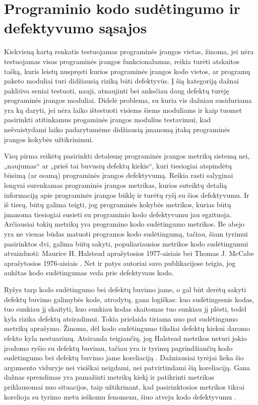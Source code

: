 \documentclass{VUMIFPSbakalaurinis}
\begin{document}
\section{Programinio kodo sudėtingumo ir defektyvumo sąsajos}
Kiekvieną kartą renkatis testuojamas programinės įrangos vietas, žinoma, jei nėra testuojamas visas programinės įrangos funkcionalumas, reikia turėti atskaitos tašką, kuris leistų nuspręsti kurios programinės įrangos kodo vietos, ar programų paketo moduliai turi didžiausią riziką būti defektyvūs. Į šią kategoriją dažnai pakliūva seniai testuoti, nauji, atnaujinti bei anksčiau daug defektų turėję programinės įrangos moduliai. Didelė problema, su kuria vis dažniau susiduriama yra ką daryti, jei nėra laiko ištestuoti visiems šiems moduliams ir kaip tuomet pasirinkti atitinkamus progaminės įrangos modulius testavimui, kad nešvaistydami laiko padarytumėme didžiausią įmanomą įtaką programinės įrangos kokybės užtikrinimui. 

Visų pirma reikėtų pasirinkti detalesnę programinės įrangos metrikų sistemą nei, „naujumas“ ar „prieš tai buvusių defektų kiekis“, kuri tiesiogiai atspindėtų būsimą (ar esamą) programinės įrangos defektyvumą. Reikia rasti salyginai lengvai surenkamas programinės įrangos metrikas, kurios suteiktų detalią informaciją apie programinės įrangos būklę ir turėtų ryšį su šios defektyvumu. Ir iš tiesų, būtų galima teigti, jog programinės kokybės metrikos, kurias būtų įmanoma tiesiogiai susieti su programinio kodo defektyvumu jau egzituoja. Arčiausiai tokių metrikų yra programino kodo sudėtingumo metrikos. Be abejo yra ne vienas būdas matuoti programos kodo sudėtingumą, tačiau, šiam tyrimui pasirinktos dvi, galima būtų sakyti, populiariausios metrikos kodo sudėtingumui atvaizduoti: Maurice H. Halstead aprašytosios 1977-aisiais \cite{Halstead:1977:ESS:540137} bei Thomas J. McCabe aprašytosios 1976-aisiais \cite{McCabe:1976:CM:800253.807712}. Net ir patys autoriai savo publikacijose teigia, jog aukštas kodo sudėtingumas veda prie defektyvaus kodo.

Ryšys tarp kodo sudėtingumo bei defektų buvimo jame, o gal būt derėtų sakyti defektų buvimo galimybės kode, atrodytų, gana logiškas: kuo sudėtingesnis kodas, tuo sunkiau jį skaityti, kuo sunkiau kodas skaitomas tuo sunkiau jį plėsti, todėl kyla rizika defektų atsiradimui. Tokia prielaida tiriama nuo pat sudėtingumo metrikų aprašymo. Žinoma, dėl kodo sudėtingumo tiksliai defektų kiekui daromo efekto kyla nestuarimų. Atsiranda teigiančių, jog Halstead metrikos neturi jokio įrodomo ryšio su defektų buvimu, tačiau yra ir tyrimų pagrindžiančių kodo sudėtingumo bei defektų buvimo jame koreliaciją \cite{Schroeder1999APG}. Dažniausiai tyrėjai lieka šio argumento viduryje nei visiškai neigdami, nei patvirtindami šią koreliaciją. Gana dažnas sprendimas yra pamažinti metrikų kiekį ir patikrinti metrikas priklausomai nuo situacijos, taip užtikrinant, kad pasirinktosios metrikos tikrai korelioja su tyrimo metu ieškomu fenomenu, šiuo atveju kodo defektyvumu \cite{MetricsinEvaluatingSoftwareDefects:2013}.
\end{document}
